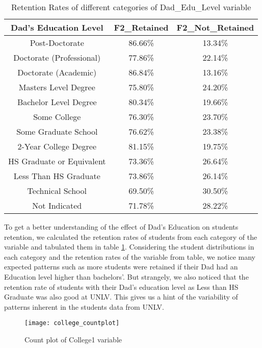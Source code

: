 \documentclass[11pt,openright]{report}
\begin{document}
\begin{table}
	\renewcommand{\arraystretch}{1.3}
	\caption{Retention Rates of different categories of Dad\_Edu\_Level variable}
	\label{table:dad_edu_retentions}
	\centering
	\begin{tabular}{|c|c|c|}
		\hline
		\bfseries Dad's Education Level & \bfseries F2\_Retained & \bfseries F2\_Not\_Retained\\
		\hline
		Post-Doctorate  & 86.66\%  & 13.34\% \\ \hline
		Doctorate (Professional) & 77.86\% &  22.14\% \\ \hline
		Doctorate (Academic) & 86.84\% & 13.16\% \\ \hline
		Masters Level Degree    &   75.80\% &  24.20\% \\ \hline
		Bachelor Level Degree &  80.34\%  & 19.66\% \\ \hline
		Some College & 76.30\% & 23.70\% \\ \hline
		Some Graduate School  & 76.62\% &  23.38\% \\ \hline
		2-Year College Degree    &  81.15\%  & 19.75\% \\ \hline
		HS Graduate or Equivalent  & 73.36\% &  26.64\% \\ \hline
		Less Than HS Graduate     & 73.86\% &  26.14\% \\ \hline
		Technical School  &         69.50\% &  30.50\% \\ \hline
		Not Indicated         &    71.78\% & 28.22\% \\ \hline
	\end{tabular}
\end{table}

To get a better understanding of the effect of Dad's Education on students retention, we calculated the retention rates of students from each category of the variable and tabulated them in table  \ref{table:dad_edu_retentions}. Considering the student distributions in each category and the retention rates of the variable from table, we notice many expected patterns such as more students were retained if their Dad had an Education level higher than bachelors'. But strangely, we also noticed that the retention rate of students with their Dad's education level as Less than HS Graduate was also good at UNLV. This gives us a hint of the variability of patterns inherent in the students data from UNLV.


\begin{figure}
	\centering
	\texttt{[image: college\_countplot]}
	\caption{Count plot of College1 variable}
	\label{fig:college_F2NotRetained_plot}
\end{figure}
\end{document}
